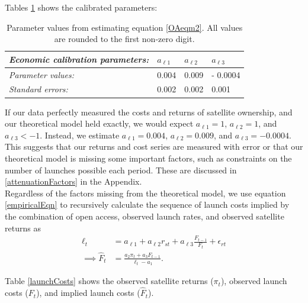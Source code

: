 \documentclass[12pt]{article}
\begin{document}
Tables \ref{econParms} shows the calibrated parameters:

\begin{table}[H]
	\centering
	\begin{tabular}{|l|l|l|l|}
		\hline
		\textit{Economic calibration parameters:}      & \textbf{$a_{\ell 1}$} & \textbf{$a_{\ell 2}$} & \textbf{$a_{\ell 3}$} \\ \hline
		\textit{Parameter values:} & 0.004               & 0.009               & - 0.0004 \\ \hline
		\textit{Standard errors:} & 0.002 & 0.002 & 0.001 \\ \hline
	\end{tabular}
	\caption{Parameter values from estimating equation \ref{OAeqm2}. All values are rounded to the first non-zero digit.}
	\label{econParms}
\end{table}

If our data perfectly measured the costs and returns of satellite ownership, and our theoretical model held exactly, we would expect $a_{\ell 1}=1$, $a_{\ell 2} = 1$, and $a_{\ell 3} < -1$. Instead, we estimate $a_{\ell 1}=0.004$, $a_{\ell 2} = 0.009$, and $a_{\ell 3} = -0.0004$. This suggests that our returns and cost series are measured with error or that our theoretical model is missing some important factors, such as constraints on the number of launches possible each period. These are discussed in \ref{attenuationFactors} in the Appendix.\\

Regardless of the factors missing from the theoretical model, we use equation \ref{empiricalEqn} to recursively calculate the sequence of launch costs implied by the combination of open access, observed launch rates, and observed satellite returns as
\begin{align}
\ell_t &= a_{\ell 1} + a_{\ell 2} r_{st} + a_{\ell 3} \frac{F_{t-1}}{F_t} + \epsilon_{r t} \nonumber \\
\implies \hat{F}_t &=	\frac{a_2 \pi_t + a_3 F_{t-1}}{\ell_t - a_1}.
\end{align}

Table \ref{launchCosts} shows the observed satellite returns ($\pi_t$), observed launch costs ($F_t$), and implied launch costs ($\hat{F}_t$).
\end{document}
